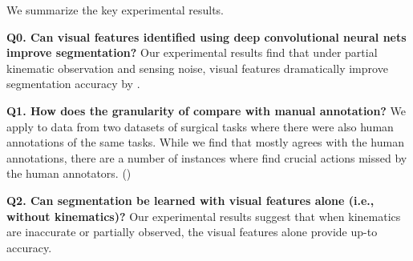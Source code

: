 We summarize the key experimental results.

\vspace{0.25em}

\noindent \textbf{Q0. Can visual features identified using deep convolutional neural nets improve segmentation? } Our experimental results find that under partial kinematic observation and sensing noise, visual features dramatically improve segmentation accuracy by .

\vspace{0.25em}

\noindent \textbf{Q1. How does the granularity of \tsc compare with manual annotation? } We apply \sys to data from two datasets of surgical tasks \cite{gao2014jigsaws} where there were also human annotations of the same tasks.
While we find that \sys mostly agrees with the human annotations, there are a number of instances where \sys find crucial actions missed by the human annotators. () 

\vspace{0.25em}

\noindent \textbf{Q2. Can segmentation be learned with visual features alone (i.e., without kinematics)? } Our experimental results suggest that when kinematics are inaccurate or partially observed, the visual features alone provide up-to  accuracy.

